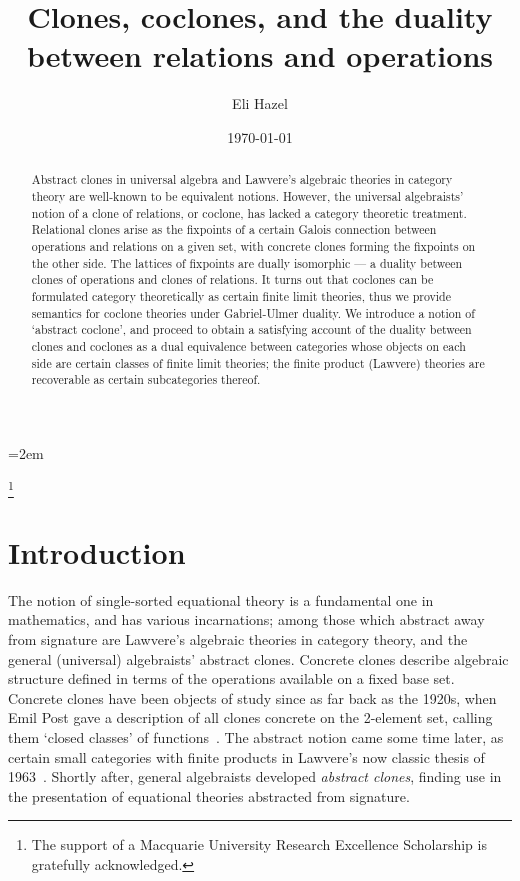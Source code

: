 \documentclass[11pt, a4paper, twoside,leqno]{amsart}
\numberwithin{equation}{section}
\theoremstyle{plain}
\theoremstyle{definition}
\begin{document}
\leftmargini=2em 
\title{Clones, coclones, and the duality between relations and operations}
\author{Eli Hazel} 
\address{School of Mathematical and Physical Sciences, Macquarie University, NSW 2109, Australia} 

\date{\today}

\thanks{The support of a Macquarie University Research Excellence
  Scholarship is gratefully acknowledged.}

\begin{abstract}
  Abstract clones in universal algebra and Lawvere's algebraic
  theories in category theory are well-known to be equivalent notions.
  However, the universal algebraists' notion of a clone of relations, or coclone, has lacked a category
  theoretic treatment. Relational clones arise as the fixpoints of a certain
  Galois connection between operations and relations on a given set,
  with concrete clones forming the fixpoints on the other side. The lattices of
  fixpoints are dually isomorphic --- a duality between
  clones of operations and clones of relations.
It turns out that coclones can be formulated category theoretically as
certain finite limit theories, thus we provide semantics for coclone theories under
Gabriel-Ulmer duality. We introduce a notion of `abstract
coclone', and proceed to obtain a satisfying account
of the duality between clones and coclones as a dual equivalence
  between categories whose objects on each side are certain classes of
  finite limit theories; the finite product (Lawvere) theories are
  recoverable as certain subcategories thereof.
\end{abstract}
\maketitle


\section{Introduction}
\label{sec:introduction}

The notion of
  single-sorted equational theory is a fundamental one in mathematics,
  and has various incarnations; among those which abstract away from signature
  are Lawvere's algebraic theories in category theory, and the general (universal) algebraists'
  abstract clones. Concrete clones describe algebraic structure defined in terms of the operations available on
  a fixed base set. Concrete clones have been objects of study since as far back as the
1920s, when Emil Post gave a description of all clones concrete on the
2-element set, calling them `closed classes' of
functions~\cite{Kerkhoff:2014aa}. The abstract notion
came some time later, as certain small categories with
finite products in Lawvere's now classic thesis of
1963~\cite{Lawvere:1963aa}.
Shortly after, general algebraists developed \emph{abstract clones},
finding use in the presentation of equational
theories abstracted from signature.
\end{document}
